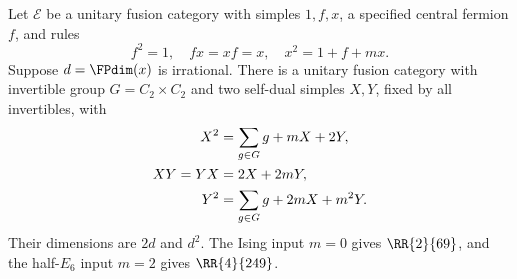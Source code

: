 \begin{theorem}\label{thm:sign-swap}
Let $\mathcal E$ be a unitary fusion category with simples $1,f,x$, a
specified central fermion $f$, and rules
\[
 f^2=1,\quad fx=xf=x,\quad x^2=1+f+mx.
\]
Suppose $d=\FPdim(x)$ is irrational. There is a unitary fusion category
with invertible group $G=C_2\times C_2$ and two self-dual simples $X,Y$,
fixed by all invertibles, with
\begin{align}
 X^2&=\sum_{g\in G}g+mX+2Y,\label{eq:sign-swap}\\
 XY=YX&=2X+2mY,\notag\\
 Y^2&=\sum_{g\in G}g+2mX+m^2Y.\notag
\end{align}
Their dimensions are $2d$ and $d^2$. The Ising input $m=0$ gives
$\RR{2}{69}$, and the half-$E_6$ input $m=2$ gives $\RR{4}{249}$.
\end{theorem}
